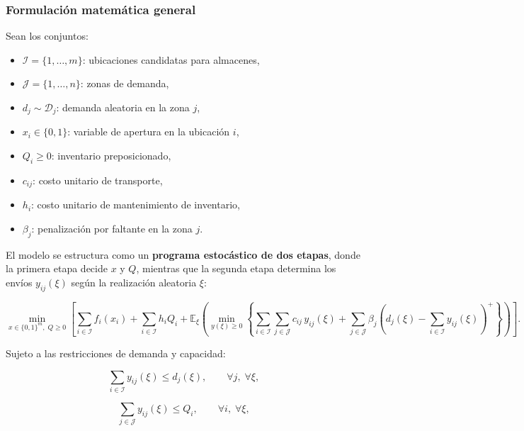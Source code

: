 \documentclass[
  spanish,
  letterpaper,
  DIV=11,
  numbers=noendperiod]{scrartcl}
\providecommand{\tightlist}{%
  \setlength{\itemsep}{0pt}\setlength{\parskip}{0pt}}
\begin{document}
\subsubsection{Formulación matemática
general}\label{formulaciuxf3n-matemuxe1tica-general}

Sean los conjuntos:

\begin{itemize}
\tightlist
\item
  \(\mathcal{I} = \{1,\dots,m\}\): ubicaciones candidatas para
  almacenes,\\
\item
  \(\mathcal{J} = \{1,\dots,n\}\): zonas de demanda,\\
\item
  \(d_j \sim \mathcal{D}_j\): demanda aleatoria en la zona \(j\),\\
\item
  \(x_i \in \{0,1\}\): variable de apertura en la ubicación \(i\),\\
\item
  \(Q_i \ge 0\): inventario preposicionado,\\
\item
  \(c_{ij}\): costo unitario de transporte,\\
\item
  \(h_i\): costo unitario de mantenimiento de inventario,\\
\item
  \(\beta_j\): penalización por faltante en la zona \(j\).
\end{itemize}

El modelo se estructura como un \textbf{programa estocástico de dos
etapas}, donde la primera etapa decide \(x\) y \(Q\), mientras que la
segunda etapa determina los envíos \(y_{ij}(\xi)\) según la realización
aleatoria \(\xi\):

\[
\min_{x \in \{0,1\}^m,\; Q \ge 0}
\left[
\sum_{i \in \mathcal{I}} f_i(x_i)
+ \sum_{i \in \mathcal{I}} h_i Q_i
+ \mathbb{E}_\xi \left(
\min_{y(\xi)\ge 0}
\left\{
\sum_{i \in \mathcal{I}} \sum_{j \in \mathcal{J}} c_{ij}\, y_{ij}(\xi)
+ \sum_{j \in \mathcal{J}} \beta_j
\left( d_j(\xi) - \sum_{i \in \mathcal{I}} y_{ij}(\xi) \right)^+
\right\}
\right)
\right].
\]

Sujeto a las restricciones de demanda y capacidad:

\[
\sum_{i \in \mathcal{I}} y_{ij}(\xi) \le d_j(\xi), \qquad \forall j, \; \forall \xi,
\]

\[
\sum_{j \in \mathcal{J}} y_{ij}(\xi) \le Q_i, \qquad \forall i, \; \forall \xi,
\]
\end{document}
